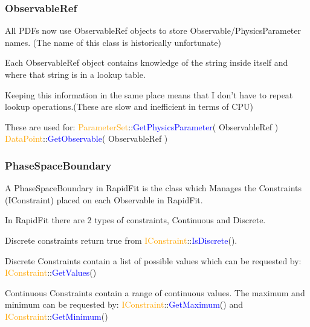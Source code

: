 \documentclass{beamer}
\begin{document}
\begin{frame}
\frametitle{ObservableRef}
All PDFs now use ObservableRef objects to store Observable/PhysicsParameter names.\newline
(The name of this class is historically unfortunate)\newline

Each ObservableRef object contains knowledge of the string inside itself and where that string is in a lookup table.\newline

Keeping this information in the same place means that I don't have to repeat lookup operations.\newline (These are slow and inefficient in terms of CPU)\newline

These are used for:\newline
\textcolor{orange}{ParameterSet}::\textcolor{blue}{GetPhysicsParameter}( ObservableRef )
\textcolor{orange}{DataPoint}::\textcolor{blue}{GetObservable}( ObservableRef )

\end{frame}

\begin{frame}
\frametitle{PhaseSpaceBoundary}
A PhaseSpaceBoundary in RapidFit is the class which Manages the Constraints (IConstraint) placed on each Observable in RapidFit.\newline

In RapidFit there are 2 types of constraints, Continuous and Discrete.\newline

Discrete constraints return true from \textcolor{orange}{IConstraint}::\textcolor{blue}{IsDiscrete}().

Discrete Constraints contain a list of possible values which can be requested by:
\textcolor{orange}{IConstraint}::\textcolor{blue}{GetValues}()\newline

Continuous Constraints contain a range of continuous values. The maximum and minimum can be requested by: \textcolor{orange}{IConstraint}::\textcolor{blue}{GetMaximum}() and \textcolor{orange}{IConstraint}::\textcolor{blue}{GetMinimum}()

\end{frame}
\end{document}
